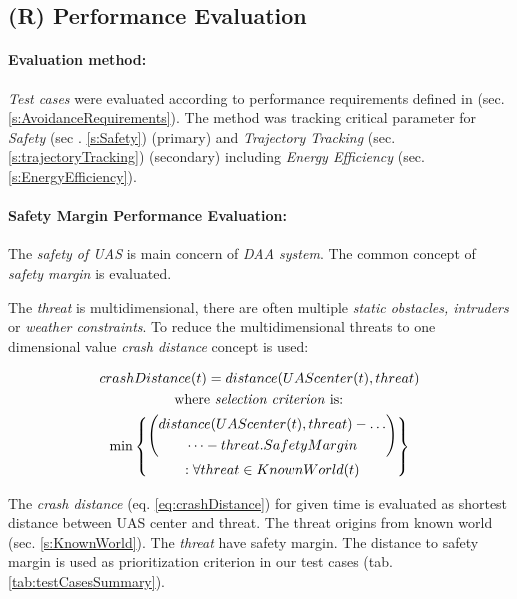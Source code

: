 \newpage
\subsection{(R) Performance Evaluation}\label{s:performanceEvaluation}
\paragraph{Evaluation method:} \emph{Test cases} were evaluated according to performance requirements defined in (sec. \ref{s:AvoidanceRequirements}). The method was tracking critical parameter for \emph{Safety} (sec . \ref{s:Safety}) (primary) and \emph{Trajectory Tracking} (sec. \ref{s:trajectoryTracking}) (secondary) including \emph{Energy Efficiency} (sec. \ref{s:EnergyEfficiency}).

\paragraph{Safety Margin Performance Evaluation:} The \emph{safety of UAS} is main concern of \emph{DAA system}. The common concept of \emph{safety margin} is evaluated. 

The \emph{threat} is multidimensional, there are often multiple \emph{static obstacles, intruders} or \emph{weather constraints}. To reduce the multidimensional threats to one dimensional value \emph{crash distance} concept is used:

\begin{multline}\label{eq:crashDistance}
    crashDistance(t) =  distance(UAScenter(t),threat) \\\text{  where \emph{selection criterion} is:  }\\ \min \left\{\begin{gathered}\left( \begin{gathered} distance(UAScenter(t),threat)-\dots\\\dots-threat.SafetyMargin\end{gathered}\right)\\:\forall threat \in KnownWorld (t)\end{gathered}\right\}
\end{multline}

The \emph{crash distance} (eq. \ref{eq:crashDistance}) for given time is evaluated as shortest distance between UAS center and threat. The threat origins from known world (sec. \ref{s:KnownWorld}). The \emph{threat} have safety margin. The distance to safety margin is used as prioritization criterion in our test cases (tab. \ref{tab:testCasesSummary}).


